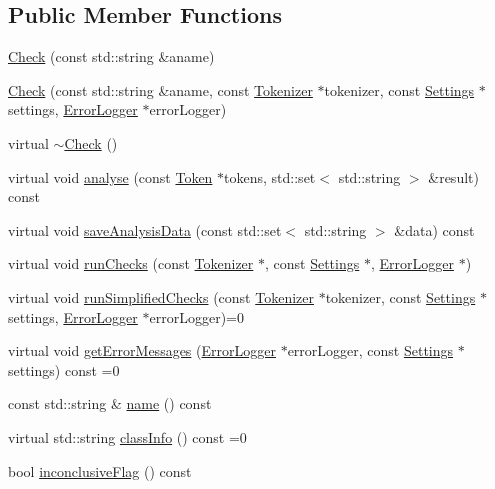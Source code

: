 \subsection*{Public Member Functions}
\begin{DoxyCompactItemize}
\item 
\hyperlink{group___core_ga0cb366bed825a49e45cce28335f75efb}{Check} (const std\-::string \&aname)
\item 
\hyperlink{class_check_acdd75b85b01a196d9ecce3c709551e01}{Check} (const std\-::string \&aname, const \hyperlink{class_tokenizer}{Tokenizer} $\ast$tokenizer, const \hyperlink{class_settings}{Settings} $\ast$settings, \hyperlink{class_error_logger}{Error\-Logger} $\ast$error\-Logger)
\item 
virtual \hyperlink{class_check_a3aa6a6acc0a9748e29dd59d78be72d0e}{$\sim$\-Check} ()
\item 
virtual void \hyperlink{class_check_a484897552dd5f9db7ce94fffa413baa4}{analyse} (const \hyperlink{class_token}{Token} $\ast$tokens, std\-::set$<$ std\-::string $>$ \&result) const 
\item 
virtual void \hyperlink{class_check_a9cd93e99992b89620ce2eadb54dd09f2}{save\-Analysis\-Data} (const std\-::set$<$ std\-::string $>$ \&data) const 
\item 
virtual void \hyperlink{class_check_a939af1c75d133393021036e73ca57cc4}{run\-Checks} (const \hyperlink{class_tokenizer}{Tokenizer} $\ast$, const \hyperlink{class_settings}{Settings} $\ast$, \hyperlink{class_error_logger}{Error\-Logger} $\ast$)
\item 
virtual void \hyperlink{class_check_a112445eed1625599b93c69aab4701e5e}{run\-Simplified\-Checks} (const \hyperlink{class_tokenizer}{Tokenizer} $\ast$tokenizer, const \hyperlink{class_settings}{Settings} $\ast$settings, \hyperlink{class_error_logger}{Error\-Logger} $\ast$error\-Logger)=0
\item 
virtual void \hyperlink{class_check_a2618762a5ca467c9aecc52071fb0a00b}{get\-Error\-Messages} (\hyperlink{class_error_logger}{Error\-Logger} $\ast$error\-Logger, const \hyperlink{class_settings}{Settings} $\ast$settings) const =0
\item 
const std\-::string \& \hyperlink{class_check_ad9b7ad147b5b4cc9b1a7911162432f1c}{name} () const 
\item 
virtual std\-::string \hyperlink{class_check_ab906c7c22915b78e931b71014e7cb327}{class\-Info} () const =0
\item 
bool \hyperlink{class_check_a8e33c7597bb283040f3d9826488a2346}{inconclusive\-Flag} () const 
\end{DoxyCompactItemize}
